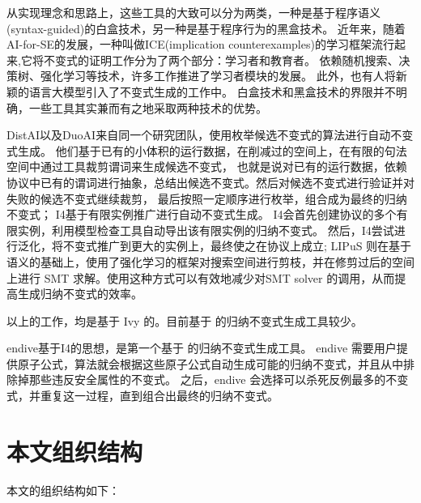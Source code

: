 从实现理念和思路上，这些工具的大致可以分为两类，一种是基于程序语义(syntax-guided)的白盒技术，另一种是基于程序行为的黑盒技术。
近年来，随着 AI-for-SE的发展，一种叫做ICE\cite{ICE}(implication counterexamples)的学习框架流行起来,它将不变式的证明工作分为了两个部分：学习者和教育者。
依赖随机搜索、决策树\cite{garg2016learning}、强化学习\cite{LIPuS}等技术，许多工作推进了学习者模块的发展。
此外，也有人将新颖的语言大模型引入了不变式生成的工作中\cite{llm}。
白盒技术和黑盒技术的界限并不明确，一些工具其实兼而有之地采取两种技术的优势。

DistAI\cite{DistAI}以及DuoAI\cite{DuoAI}来自同一个研究团队，使用枚举候选不变式的算法进行自动不变式生成。
他们基于已有的小体积的运行数据，在削减过的空间上，在有限的句法空间中通过工具裁剪谓词来生成候选不变式，
也就是说对已有的运行数据，依赖协议中已有的谓词进行抽象，总结出候选不变式。然后对候选不变式进行验证并对失败的候选不变式继续裁剪，
最后按照一定顺序进行枚举，组合成为最终的归纳不变式；
I4\cite{I4}基于有限实例推广进行自动不变式生成。
I4会首先创建协议的多个有限实例，利用模型检查工具自动导出该有限实例的归纳不变式。
然后，I4尝试进行泛化，将不变式推广到更大的实例上，最终使之在协议上成立;
LIPuS 则在基于语义的基础上，使用了强化学习的框架对搜索空间进行剪枝，并在修剪过后的空间上进行 SMT 求解。使用这种方式可以有效地减少对SMT solver 的调用，从而提高生成归纳不变式的效率。

以上的工作，均是基于 Ivy 的。目前基于 \TLA 的归纳不变式生成工具较少。

endive\cite{endive}基于I4的思想，是第一个基于 \TLA 的归纳不变式生成工具。
endive 需要用户提供原子公式，算法就会根据这些原子公式自动生成可能的归纳不变式，并且从中排除掉那些违反安全属性的不变式。
之后，endive 会选择可以杀死反例最多的不变式，并重复这一过程，直到组合出最终的归纳不变式。

\section{本文组织结构}
本文的组织结构如下：
